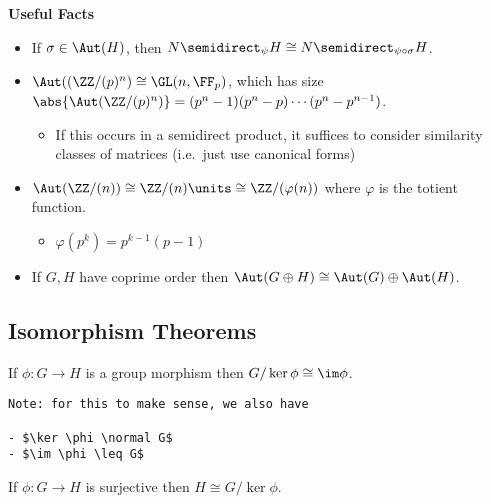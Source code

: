 \textbf{Useful Facts}

\begin{itemize}
\item
  If \(\sigma \in \Aut(H)\), then
  \(N \semidirect_\psi H \cong N \semidirect_{\psi \circ \sigma} H\).
\item
  \(\Aut((\ZZ/(p)^n) \cong \GL(n, \FF_p)\), which has size
  \(\abs{\Aut(\ZZ/(p)^n)} = (p^n-1)(p^n-p)\cdots(p^n-p^{n-1})\).

  \begin{itemize}
  \tightlist
  \item
    If this occurs in a semidirect product, it suffices to consider
    similarity classes of matrices (i.e.~just use canonical forms)
  \end{itemize}
\item
  \(\Aut(\ZZ/(n)) \cong \ZZ/(n)\units \cong \ZZ/({\varphi(n)})\) where
  \(\varphi\) is the totient function.

  \begin{itemize}
  \tightlist
  \item
    \(\varphi(p^k) = p^{k-1}(p-1)\)
  \end{itemize}
\item
  If \(G, H\) have coprime order then
  \(\Aut(G\oplus H) \cong \Aut(G) \oplus \Aut(H)\).
\end{itemize}

\hypertarget{isomorphism-theorems}{%
\subsection{Isomorphism Theorems}\label{isomorphism-theorems}}

\begin{theorem}

If \(\phi:G\to H\) is a group morphism then
\(G/\ker \phi \cong \im \phi\).

\begin{verbatim}
Note: for this to make sense, we also have

- $\ker \phi \normal G$
- $\im \phi \leq G$
\end{verbatim}

\end{theorem}

\begin{corollary}

If \(\phi: G\to H\) is surjective then \(H\cong G/\ker \phi\).

\end{corollary}

